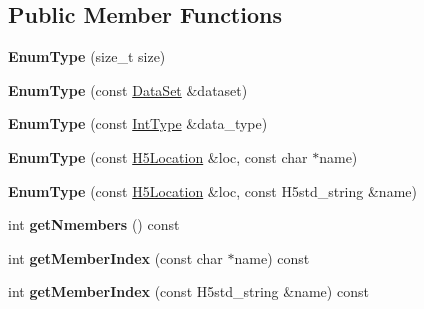 \subsection*{Public Member Functions}
\begin{DoxyCompactItemize}
\item 
\mbox{\label{class_h5_1_1_enum_type_a38608d554e69b2880e8fcf000523dff8}} 
{\bfseries Enum\+Type} (size\+\_\+t size)
\item 
\mbox{\label{class_h5_1_1_enum_type_a22618bff56623043a64afafb1b6acdca}} 
{\bfseries Enum\+Type} (const \hyperlink{class_h5_1_1_data_set}{Data\+Set} \&dataset)
\item 
\mbox{\label{class_h5_1_1_enum_type_afc61afae0268090c874fe384f56ae1f5}} 
{\bfseries Enum\+Type} (const \hyperlink{class_h5_1_1_int_type}{Int\+Type} \&data\+\_\+type)
\item 
\mbox{\label{class_h5_1_1_enum_type_afdee85da8ecd157c6b708dd584538a42}} 
{\bfseries Enum\+Type} (const \hyperlink{class_h5_1_1_h5_location}{H5\+Location} \&loc, const char $\ast$name)
\item 
\mbox{\label{class_h5_1_1_enum_type_ac58706f0a9df3206c4f6f5ee17b35578}} 
{\bfseries Enum\+Type} (const \hyperlink{class_h5_1_1_h5_location}{H5\+Location} \&loc, const H5std\+\_\+string \&name)
\item 
\mbox{\label{class_h5_1_1_enum_type_ab376b82cb30720d40796039b8ca3953f}} 
int {\bfseries get\+Nmembers} () const
\item 
\mbox{\label{class_h5_1_1_enum_type_ad4a24c289edd87394755c5fbfdb0cd95}} 
int {\bfseries get\+Member\+Index} (const char $\ast$name) const
\item 
\mbox{\label{class_h5_1_1_enum_type_a8a235a8042ddb8d7a94e429830843c45}} 
int {\bfseries get\+Member\+Index} (const H5std\+\_\+string \&name) const
\item 
\mbox{\label{class_h5_1_1_enum_type_a910e46db41ff139bece3993ae74fc19d}} 

\end{DoxyCompactItemize}
